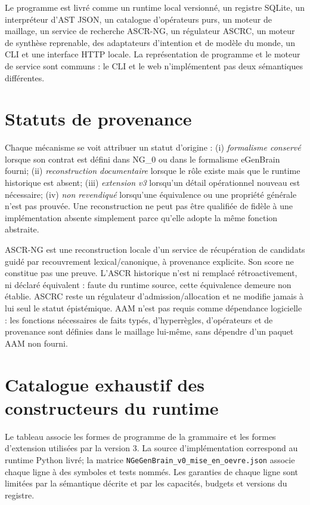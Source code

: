 \documentclass[11pt,a4paper,openany]{book}
\newcommand{\code}[1]{\texttt{#1}}
\theoremstyle{definition}
\theoremstyle{plain}
\theoremstyle{remark}
\begin{document}
Le programme est livré comme un runtime local versionné, un registre SQLite, un interpréteur d'AST JSON, un catalogue d'opérateurs purs, un moteur de maillage, un service de recherche ASCR-NG, un régulateur ASCRC, un moteur de synthèse reprenable, des adaptateurs d'intention et de modèle du monde, un CLI et une interface HTTP locale. La représentation de programme et le moteur de service sont communs : le CLI et le web n'implémentent pas deux sémantiques différentes.

\section{Statuts de provenance}
Chaque mécanisme se voit attribuer un statut d'origine : (i) \emph{formalisme conservé} lorsque son contrat est défini dans NG\_0 ou dans le formalisme eGenBrain fourni; (ii) \emph{reconstruction documentaire} lorsque le rôle existe mais que le runtime historique est absent; (iii) \emph{extension v3} lorsqu'un détail opérationnel nouveau est nécessaire; (iv) \emph{non revendiqué} lorsqu'une équivalence ou une propriété générale n'est pas prouvée. Une reconstruction ne peut pas être qualifiée de fidèle à une implémentation absente simplement parce qu'elle adopte la même fonction abstraite.

ASCR-NG est une reconstruction locale d'un service de récupération de candidats guidé par recouvrement lexical/canonique, à provenance explicite. Son score ne constitue pas une preuve. L'ASCR historique n'est ni remplacé rétroactivement, ni déclaré équivalent : faute du runtime source, cette équivalence demeure non établie. ASCRC reste un régulateur d'admission/allocation et ne modifie jamais à lui seul le statut épistémique. AAM n'est pas requis comme dépendance logicielle : les fonctions nécessaires de faits typés, d'hyperrègles, d'opérateurs et de provenance sont définies dans le maillage lui-même, sans dépendre d'un paquet AAM non fourni.

\section{Catalogue exhaustif des constructeurs du runtime}
Le tableau associe les formes de programme de la grammaire et les formes d'extension utilisées par la version 3. La source d'implémentation correspond au runtime Python livré; la matrice \code{NGeGenBrain\_v0\_mise\_en\_oevre.json} associe chaque ligne à des symboles et tests nommés. Les garanties de chaque ligne sont limitées par la sémantique décrite et par les capacités, budgets et versions du registre.
\end{document}
